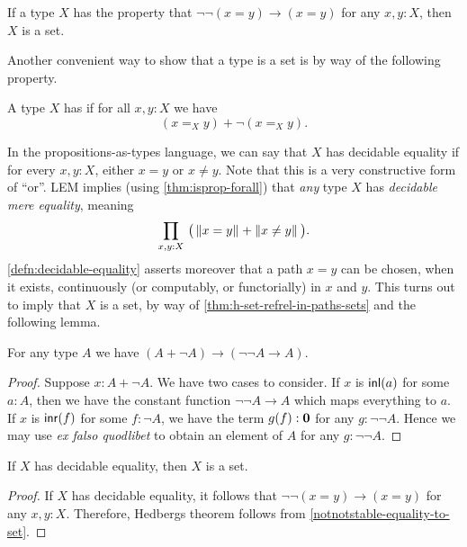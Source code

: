 \begin{cor}\label{notnotstable-equality-to-set}
  If a type $X$ has the property that $\neg\neg(x=y)\to(x=y)$ for any $x,y:X$, then $X$ is a set.
\end{cor}

Another convenient way to show that a type is a set is by way of the following property.

\begin{defn}\label{defn:decidable-equality}
 A type $X$ has  if for all $x, y : X$ we have
 \[(x =_X y) + \neg (x =_X y).\]
\end{defn}

In the propositions-as-types language, we can say that $X$ has decidable equality if for every $x,y:X$, either $x=y$ or $x\neq y$.
Note that this is a very constructive form of ``or''.
LEM implies (using \autoref{thm:isprop-forall}) that \emph{any} type $X$ has \emph{decidable mere equality}, meaning
\[\prd{x,y:X} \big(\brck{x=y} + \brck{x\neq y}\big).\]
\autoref{defn:decidable-equality} asserts moreover that a path $x=y$ can be chosen, when it exists, continuously (or computably, or
functorially) in $x$ and $y$.
This turns out to imply that $X$ is a set, by way of \autoref{thm:h-set-refrel-in-paths-sets} and the following lemma.

\begin{lem}
For any type $A$ we have $(A+\neg A)\to(\neg\neg A\to A)$.
\end{lem}

\begin{proof}
Suppose $x:A+\neg A$. We have two cases to consider.
If $x$ is ${\mathsf{inl}}(a)$ for some $a:A$, then we have the constant function $\neg\neg A
\to A$ which maps everything to $a$. If $x$ is ${\mathsf{inr}}(f)$ for some $f:\neg A$,
we have the term $g(f):\mathbf{0}$ for any $g:\neg\neg A$. Hence we may use
\textit{ex falso quodlibet} to obtain an element of $A$ for any $g:\neg\neg A$.
\end{proof}

\begin{thm}[Hedberg]\label{thm:hedberg}
  If $X$ has decidable equality, then $X$ is a set.
\end{thm}

\begin{proof}
If $X$ has decidable equality, it follows that $\neg\neg(x=y)\to(x=y)$ for any
$x,y:X$. Therefore, Hedbergs theorem follows from 
\autoref{notnotstable-equality-to-set}.
\end{proof}

